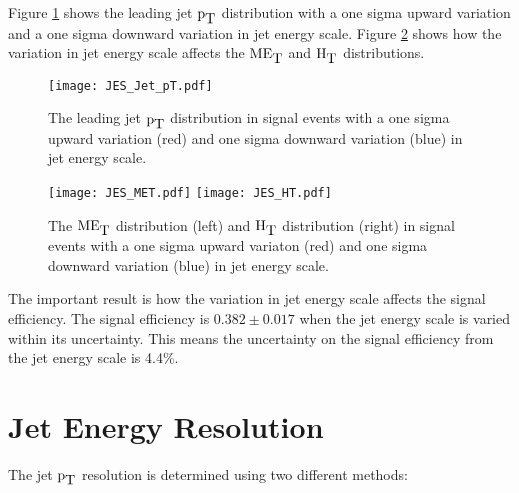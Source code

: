 Figure \ref{fig:JES_Jet_pT} shows the leading jet $\mbox{p}_{\mbox{T}}$ distribution with a one 
sigma upward variation and a one sigma downward variation in jet energy scale. 
Figure \ref{fig:JES_MET_And_HT} shows how the variation in jet energy scale 
affects the $\mbox{ME}_{\mbox{T}}$ and $\mbox{H}_{\mbox{T}}$ distributions. \\

\begin{figure}
\begin{center}
\texttt{[image: JES\_Jet\_pT.pdf]}
\end{center}
\caption{The leading jet $\mbox{p}_{\mbox{T}}$ distribution in signal events with a one sigma
upward variation (red) and one sigma downward variation (blue) in jet energy
scale.}
\label{fig:JES_Jet_pT}
\end{figure}

\begin{figure}
\texttt{[image: JES\_MET.pdf]}
\texttt{[image: JES\_HT.pdf]}
\caption{The $\mbox{ME}_{\mbox{T}}$ distribution (left) and $\mbox{H}_{\mbox{T}}$ distribution (right) in signal
events with a one sigma upward variaton (red) and one sigma downward variation
(blue) in jet energy scale.}
\label{fig:JES_MET_And_HT}
\end{figure}

The important result is how the variation in jet energy scale affects the signal
efficiency. The signal efficiency is $0.382\pm0.017$ when the jet energy scale
is varied within its uncertainty. This means the uncertainty on the signal
efficiency from the jet energy scale is 4.4\%.


\section{Jet Energy Resolution}

The jet $\mbox{p}_{\mbox{T}}$ resolution is determined using two different methods: 

